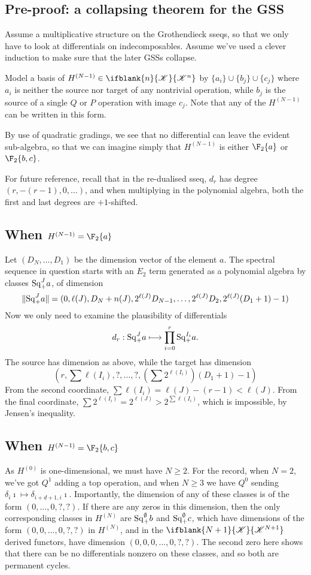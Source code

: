 \documentclass[10pt]{article}
\newcommand{\LL}[1]{\ifblank{#1}{\scrK}{\scrK^{#1}}}
\renewcommand{\Q}{Q}
\newcommand{\SqShift}{\Sq_{\smash{+}}}
\newcommand{\Sq}{\mathrm{Sq}}
\begin{document}
\begin{grothendieck collapse}
\section{Pre-proof: a collapsing theorem for the GSS}
Assume a multiplicative structure on the Grothendieck sseqs, so that we only have to look at differentials on indecomposables. Assume we've used a clever induction to make sure that the later GSSs collapse.

Model a basis of $H^{(N-1)}\in\LL{n}$ by $\{a_i\}\cup \{b_{j}\}\cup \{c_{j}\}$ where $a_i$ is neither the source nor target of any nontrivial operation, while $b_{j}$ is the source of a single $\Q$ or $P$ operation with image $c_j$. Note that any of the $H^{(N-1)}$ can be written in this form.

By use of quadratic gradings, we see that no differential can leave the evident sub-algebra, so that we can imagine simply that $H^{(N-1)}$ is either $\F_2\{a\}$ or $\F_2\{b,c\}$.

For future reference, recall that in the re-dualised sseq, $d_r$ has degree $(r,-(r-1),0,\ldots)$, and when multiplying in the polynomial algebra, both the first and last degrees are $+1$-shifted.
\subsection{When $H^{(N-1)}=\F_2\{a\}$}
Let $(D_N,\ldots,D_1)$ be the dimension vector of the element $a$.
The spectral sequence in question starts with an $E_2$ term generated as a polynomial algebra by classes $\SqShift^Ja$, of dimension
\[\|\SqShift^Ja\|=(0,\ell(J),D_N+n(J),2^{\ell(J)}D_{N-1},\ldots,2^{\ell(J)}D_{2},2^{\ell(J)}(D_{1}+1)-1)\]
Now we only need to examine the plausibility of differentials
\[d_r:\SqShift^Ja\mapsto \prod_{i=0}^r\SqShift^{I_i}a.\]
The source has dimension as above, while the target has dimension
\[(r,\textstyle\sum\ell(I_i),?,\ldots,?,(\textstyle\sum2^{\ell(I_i)})(D_{1}+1)-1)\]
From the second coordinate, $\sum\ell(I_i)=\ell(J)-(r-1)<\ell(J)$. From the final coordinate, $\sum2^{\ell(I_i)}=2^{\ell(J)}>2^{\sum\ell(I_i)}$, which is impossible, by Jensen's inequality.
\subsection{When $H^{(N-1)}=\F_2\{b,c\}$}
As $H^{(0)}$ is one-dimensional, we must have $N\geq2$. For the record, when $N=2$, we've got $Q^1$ adding a top operation, and when $N\geq3$ we have $Q^0$ sending $\delta_{i}\imath\mapsto \delta_{i+d+1,i}\imath$. Importantly, the dimension of any of these classes is of the form $(0,\ldots,0,?,?)$. If there are any zeros in this dimension, then the only corresponding classes in $H^{(N)}$ are $\SqShift^{\emptyset}b$ and $\SqShift^{\emptyset}c$, which have dimensions of the form $(0,0,\ldots,0,?,?)$ in $H^{(N)}$, and in the $\LL{N+1}$ derived functors, have dimension $(0,0,0,\ldots,0,?,?)$. The second zero here shows that there can be no differentials nonzero on these classes, and so both are permanent cycles.


\end{grothendieck collapse}
\end{document}

